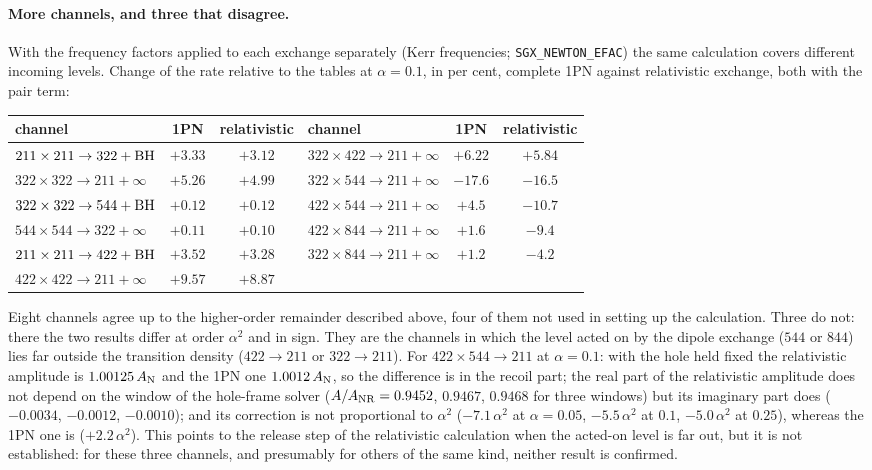 \documentclass[11pt]{article}
\begin{document}
\paragraph{More channels, and three that disagree.} With the frequency factors applied to each exchange separately (Kerr frequencies;
\texttt{SGX\_NEWTON\_EFAC}) the same calculation covers different incoming levels. Change of the rate relative to the tables at
$\alpha=0.1$, in per cent, complete 1PN against relativistic exchange, both with the pair term:
\begin{center}
\begin{tabular}{@{}lcc@{\qquad\quad}lcc@{}}
\toprule
channel & 1PN & relativistic & channel & 1PN & relativistic \\
\midrule
$211\times211\to322+{\rm BH}$ & $+3.33$ & $+3.12$ & $322\times422\to211+\infty$ & $+6.22$ & $+5.84$ \\
$322\times322\to211+\infty$ & $+5.26$ & $+4.99$ & $322\times544\to211+\infty$ & $-17.6$ & $-16.5$ \\
$322\times322\to544+{\rm BH}$ & $+0.12$ & $+0.12$ & $422\times544\to211+\infty$ & $+4.5$ & $-10.7$ \\
$544\times544\to322+\infty$ & $+0.11$ & $+0.10$ & $422\times844\to211+\infty$ & $+1.6$ & $-9.4$ \\
$211\times211\to422+{\rm BH}$ & $+3.52$ & $+3.28$ & $322\times844\to211+\infty$ & $+1.2$ & $-4.2$ \\
$422\times422\to211+\infty$ & $+9.57$ & $+8.87$ & & & \\
\bottomrule
\end{tabular}
\end{center}
Eight channels agree up to the higher-order remainder described above, four of them not used in setting up the calculation. Three do not:
there the two results differ at order $\alpha^2$ and in sign. They are the channels in which the level acted on by the dipole exchange
($544$ or $844$) lies far outside the transition density ($422\to211$ or $322\to211$). For $422\times544\to211$ at $\alpha=0.1$: with the
hole held fixed the relativistic amplitude is $1.00125\,A_{\rm N}$ and the 1PN one $1.0012\,A_{\rm N}$, so the difference is in the recoil
part; the real part of the relativistic amplitude does not depend on the window of the hole-frame solver ($A/A_{\rm NR}=0.9452$, $0.9467$,
$0.9468$ for three windows) but its imaginary part does ($-0.0034$, $-0.0012$, $-0.0010$); and its correction is not proportional to
$\alpha^2$ ($-7.1\,\alpha^2$ at $\alpha=0.05$, $-5.5\,\alpha^2$ at $0.1$, $-5.0\,\alpha^2$ at $0.25$), whereas the 1PN one is ($+2.2\,\alpha^2$).
This points to the release step of the relativistic calculation when the acted-on level is far out, but it is not established:
for these three channels, and presumably for others of the same kind, neither result is confirmed.
\end{document}
